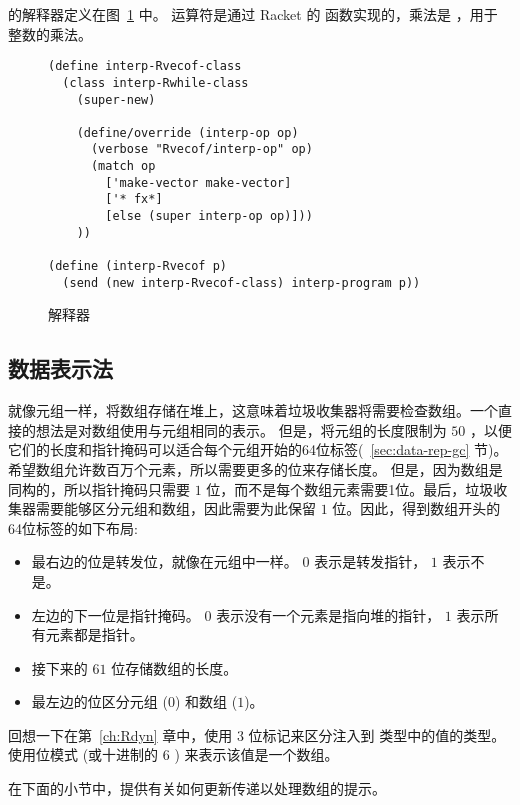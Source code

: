 \documentclass[11pt]{book}
\begin{document}
 \LangArray{} 的解释器定义在图~\ref{fig:interp-Rvecof} 中。  运算符是通过 Racket 的  函数实现的，乘法是  ，用于  整数的乘法。

\begin{figure}[tbp]
\begin{lstlisting}
(define interp-Rvecof-class
  (class interp-Rwhile-class
    (super-new)

    (define/override (interp-op op)
      (verbose "Rvecof/interp-op" op)
      (match op
        ['make-vector make-vector]
        ['* fx*]
        [else (super interp-op op)]))
    ))

(define (interp-Rvecof p)
  (send (new interp-Rvecof-class) interp-program p))
\end{lstlisting}
\caption{\LangArray{} 解释器}
\label{fig:interp-Rvecof}
\end{figure}


\subsection{数据表示法}
\label{sec:array-rep}

就像元组一样，将数组存储在堆上，这意味着垃圾收集器将需要检查数组。一个直接的想法是对数组使用与元组相同的表示。
但是，将元组的长度限制为 $50$ ，以便它们的长度和指针掩码可以适合每个元组开始的64位标签(~\ref{sec:data-rep-gc} 节)。希望数组允许数百万个元素，所以需要更多的位来存储长度。
但是，因为数组是同构的，所以指针掩码只需要 $1$ 位，而不是每个数组元素需要1位。最后，垃圾收集器需要能够区分元组和数组，因此需要为此保留 $1$ 位。因此，得到数组开头的64位标签的如下布局:
\begin{itemize}
\item 最右边的位是转发位，就像在元组中一样。
   $0$ 表示是转发指针， $1$ 表示不是。
  
\item 左边的下一位是指针掩码。 $0$ 表示没有一个元素是指向堆的指针， $1$
  表示所有元素都是指针。

\item 接下来的 $61$ 位存储数组的长度。

\item 最左边的位区分元组 ($0$) 和数组 ($1$)。
\end{itemize}


回想一下在第~\ref{ch:Rdyn} 章中，使用 $3$ 位标记来区分注入到
 类型中的值的类型。使用位模式  (或十进制的 $6$ )
来表示该值是一个数组。

在下面的小节中，提供有关如何更新传递以处理数组的提示。
\end{document}

